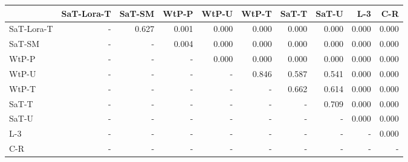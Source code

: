 \begin{tabular}{lrrrrrrrrr}
\toprule
 & SaT-Lora-T & SaT-SM & WtP-P & WtP-U & WtP-T & SaT-T & SaT-U & L-3 & C-R \\
\midrule
SaT-Lora-T & - & 0.627 & 0.001 & 0.000 & 0.000 & 0.000 & 0.000 & 0.000 & 0.000 \\
SaT-SM & - & - & 0.004 & 0.000 & 0.000 & 0.000 & 0.000 & 0.000 & 0.000 \\
WtP-P & - & - & - & 0.000 & 0.000 & 0.000 & 0.000 & 0.000 & 0.000 \\
WtP-U & - & - & - & - & 0.846 & 0.587 & 0.541 & 0.000 & 0.000 \\
WtP-T & - & - & - & - & - & 0.662 & 0.614 & 0.000 & 0.000 \\
SaT-T & - & - & - & - & - & - & 0.709 & 0.000 & 0.000 \\
SaT-U & - & - & - & - & - & - & - & 0.000 & 0.000 \\
L-3 & - & - & - & - & - & - & - & - & 0.000 \\
C-R & - & - & - & - & - & - & - & - & - \\
\bottomrule
\end{tabular}

